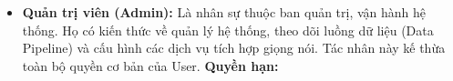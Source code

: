 \begin{itemize}
\item \textbf{Quản trị viên (Admin):}
Là nhân sự thuộc ban quản trị, vận hành hệ thống.
Họ có kiến thức
về quản lý hệ thống,
theo dõi luồng dữ liệu (Data Pipeline)
và cấu hình các dịch vụ tích hợp giọng nói.
Tác nhân này kế thừa toàn bộ quyền cơ bản của User.
\textbf{Quyền hạn:}






\end{itemize}
